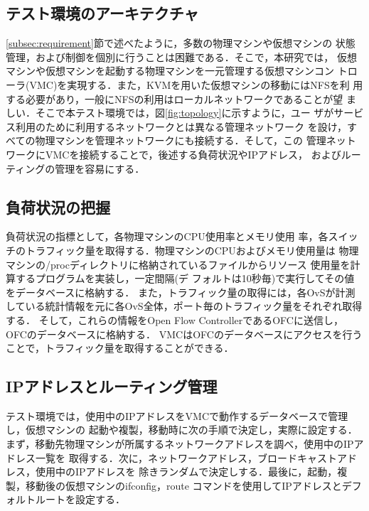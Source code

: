 \documentclass[submit,techrep]{ipsj}
\begin{document}
\subsection{テスト環境のアーキテクチャ}\label{subsec:arch}
\ref{subsec:requirement}節で述べたように，多数の物理マシンや仮想マシンの
状態管理，および制御を個別に行うことは困難である．そこで，本研究では，
仮想マシンや仮想マシンを起動する物理マシンを一元管理する仮想マシンコン
トローラ(VMC)を実現する．また，KVMを用いた仮想マシンの移動にはNFSを利
用する必要があり，一般にNFSの利用はローカルネットワークであることが望
ましい．そこで本テスト環境では，図\ref{fig:topology}に示すように，ユー
ザがサービス利用のために利用するネットワークとは異なる管理ネットワーク
を設け，すべての物理マシンを管理ネットワークにも接続する．そして，この
管理ネットワークにVMCを接続することで，後述する負荷状況やIPアドレス，
およびルーティングの管理を容易にする．


\subsection{負荷状況の把握}
負荷状況の指標として，各物理マシンのCPU使用率とメモリ使用
率，各スイッチのトラフィック量を取得する．物理マシンのCPUおよびメモリ使用量は
物理マシンの/procディレクトリに格納されているファイルからリソース
使用量を計算するプログラムを実装し，一定間隔(デ
フォルトは10秒毎)で実行してその値をデータベースに格納する．
また，トラフィック量の取得には，各OvSが計測している統計情報を元に各OvS全体，ポート毎のトラフィック量をそれぞれ取得する．
そして，これらの情報をOpen Flow ControllerであるOFCに送信し，OFCのデータベースに格納する．
VMCはOFCのデータベースにアクセスを行うことで，トラフィック量を取得することができる．


\subsection{IPアドレスとルーティング管理}
テスト環境では，使用中のIPアドレスをVMCで動作するデータベースで管理し，仮想マシンの
起動や複製，移動時に次の手順で決定し，実際に設定する．
まず，移動先物理マシンが所属するネットワークアドレスを調べ，使用中のIPアドレス一覧を
取得する．次に，ネットワークアドレス，ブロードキャストアドレス，使用中のIPアドレスを
除きランダムで決定しする．最後に，起動，複製，移動後の仮想マシンのifconfig，route
コマンドを使用してIPアドレスとデフォルトルートを設定する．
\end{document}
